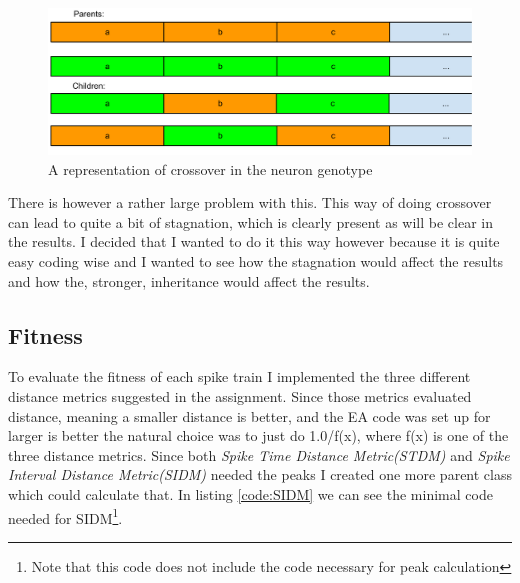 \begin{figure}[h]
	\centering
	\includegraphics[scale=0.5]{crossover.pdf}
	\caption{A representation of crossover in the neuron genotype}
	\label{fig:neuron-crossover}
\end{figure}

There is however a rather large problem with this. This way of doing crossover
can lead to quite a bit of stagnation, which is clearly present as will be
clear in the results. I decided that I wanted to do it this way however because
it is quite easy coding wise and I wanted to see how the stagnation would affect
the results and how the, stronger, inheritance would affect the results.

\subsection{Fitness}\label{sec:fitness-description}
To evaluate the fitness of each spike train I implemented the three different
distance metrics suggested in the assignment. Since those metrics evaluated
distance, meaning a smaller distance is better, and the EA code was set up for
larger is better the natural choice was to just do 1.0/f(x), where f(x) is one of
the three distance metrics. Since both \textit{Spike Time Distance Metric(STDM)}
and \textit{Spike Interval Distance Metric(SIDM)} needed the peaks I created one
more parent class which could calculate that. In listing \ref{code:SIDM} we can
see the minimal code needed for SIDM\footnote{Note that this code does not
include the code necessary for peak calculation}.


